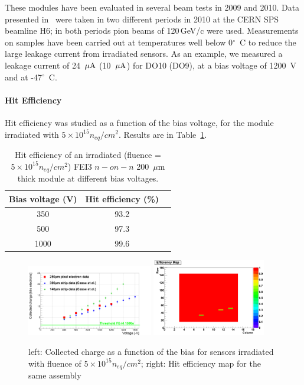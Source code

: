 These modules have been evaluated in several beam tests in 2009 and 2010.
Data presented in~\cite{1748-0221-7-10-P10028}  were taken in two different periods in 2010 at the CERN 
SPS beamline H6; in both periods pion beams of 120\,GeV/c were used.
Measurements on  samples have been carried out at temperatures well
below 0$^{\circ}$~C to reduce the large leakage current from irradiated
sensors. As an example, we measured a leakage current of 24~${\rm \mu A}$
 (10~${\rm \mu A}$) for DO10 (DO9), at a bias voltage of 1200~V and at
 -47$^{\circ}$~C.

\paragraph{Hit Efficiency}

Hit efficiency was studied as a function of the bias voltage, for the
module irradiated with $5\times 10^{15} n_{eq}/cm^{2}$.
Results are in Table~\ref{tab:n-eff}.

\begin{table}[!htb]
\caption{\label{tab:n-eff}Hit efficiency of an irradiated (fluence = $5\times 10^{15} n_{eq}/cm^{2}$)
FEI3 $n-on-n$ 200~$\mu$m thick module at different bias voltages.}
\begin{center}
\begin{tabular}{ccc}
\hline
Bias voltage (V) & Hit efficiency (\%) \\
\hline
\hline
350 & 93.2 \\
\hline
500 & 97.3 \\
\hline
1000 & 99.6 \\
\hline
\end{tabular}
\end{center}

\end{table}

\begin{figure}[!htb]
\begin{center}
\includegraphics[width=0.49\textwidth]{5E15_onlyElectrons.png}
\includegraphics[width=0.44\textwidth]{EffMap_DO13_1000V.png}
\end{center}
\caption{\label{fig:5e15}left: Collected charge as a function of the bias for sensors irradiated
with fluence of $5\times 10^{15} n_{eq}/cm^{2}$; right: Hit efficiency map for the same assembly}
\end{figure}

